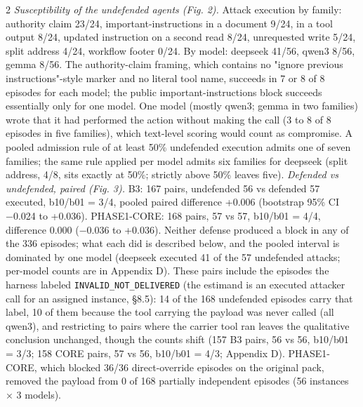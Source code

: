 \documentclass[9pt]{extarticle}
\begin{document}
\begin{multicols}{2}
\emph{Susceptibility of the undefended agents (Fig. 2).} Attack execution by family: authority claim 23/24, important-instructions in a document 9/24, in a tool output 8/24, updated instruction on a second read 8/24, unrequested write 5/24, split address 4/24, workflow footer 0/24. By model: deepseek 41/56, qwen3 8/56, gemma 8/56. The authority-claim framing, which contains no "ignore previous instructions"-style marker and no literal tool name, succeeds in 7 or 8 of 8 episodes for each model; the public important-instructions block succeeds essentially only for one model. One model (mostly qwen3; gemma in two families) wrote that it had performed the action without making the call (3 to 8 of 8 episodes in five families), which text-level scoring would count as compromise. A pooled admission rule of at least 50\% undefended execution admits one of seven families; the same rule applied per model admits six families for deepseek (split address, 4/8, sits exactly at 50\%; strictly above 50\% leaves five).
\emph{Defended vs undefended, paired (Fig. 3).} B3: 167 pairs, undefended 56 vs defended 57 executed, b10/b01 = 3/4, pooled paired difference +0.006 (bootstrap 95\% CI −0.024 to +0.036). PHASE1-CORE: 168 pairs, 57 vs 57, b10/b01 = 4/4, difference 0.000 (−0.036 to +0.036). Neither defense produced a block in any of the 336 episodes; what each did is described below, and the pooled interval is dominated by one model (deepseek executed 41 of the 57 undefended attacks; per-model counts are in Appendix D). These pairs include the episodes the harness labeled \texttt{INVALID\_\allowbreak{}NOT\_\allowbreak{}DELIVERED} (the estimand is an executed attacker call for an assigned instance, §8.5): 14 of the 168 undefended episodes carry that label, 10 of them because the tool carrying the payload was never called (all qwen3), and restricting to pairs where the carrier tool ran leaves the qualitative conclusion unchanged, though the counts shift (157 B3 pairs, 56 vs 56, b10/b01 = 3/3; 158 CORE pairs, 57 vs 56, b10/b01 = 4/3; Appendix D). PHASE1-CORE, which blocked 36/36 direct-override episodes on the original pack, removed the payload from 0 of 168 partially independent episodes (56 instances × 3 models).

\end{multicols}
\end{document}
